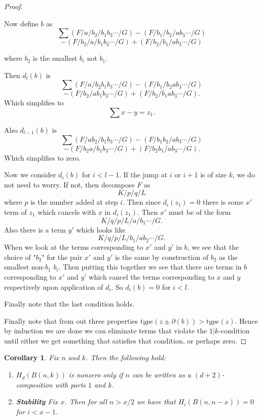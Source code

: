 \documentclass{amsart}
\newtheorem{corollary}[theorem]{Corollary}
\begin{document}
\begin{proof}
\begin{enumerate}
        Now define $b$ as
        $$ \sum (F/a/b_2/b_1b_3 \cdots/G) - (F/b_1/b_2/ab_3 \cdots/G)$$  
        $$- (F/b_2/a/b_1b_3 \cdots/G) + (F/b_2/b_1/ab_3 \cdots /G)$$
       
        where $b_2$ is the smallest $b_i$ not $b_1$.

        Then $d_l(b)$ is $$\sum (F/a/b_2b_1b_3 \cdots/G) - (F/b_1/b_2ab_3 \cdots/G)$$  $$- (F/b_2/ab_1b_3 \cdots/G) + 
        (F/b_2/b_1ab_3 \cdots /G).$$ Which simplifies to $$ \sum x-y = z_1.$$

        Also $d_{l-1}(b)$ is $$\sum (F/ab_2/b_1b_3 \cdots/G) - (F/b_1b_2/ab_3 \cdots/G)$$ $$- (F/b_2a/b_1b_3 \cdots/G) + 
        (F/b_2b_1/ab_3 \cdots /G).$$ Which simplifies to zero.


        Now we consider $d_i(b)$ for $i < l-1$. If the jump at $i$ or $i+1$ is of size $k$, we do not need to worry. 
        If not, then decompose $F$ as $$K/p/q/L$$ where $p$ is the number added at step $i$. Then since $d_i(z_1)=0$ there is some $x'$ term
        of $z_1$ which cancels with $x$ in $d_i(z_1)$. Then $x'$ must be of the form $$ K/q/p/L/a/b_1 \cdots/G.$$ Also there is a term $y'$
        which looks like $$K/q/p/L/b_1/ab_2 \cdots/G.$$ When we look at the terms corresponding to $x'$ and $y'$ in $b$, we see that the 
        choice of "$b_2$" for the pair $x'$ and $y'$ is the same by construction of $b_2$ as the smallest non-$b_1$ $b_i$. Then putting this
        together we see that there are terms in $b$ corresponding to $x'$ and $y'$ which cancel the terms corresponding to $x$ and $y$ 
        respectively upon application of $d_i$. So $d_i(b) = 0$ for $i < l$.

        Finally note that the last condition holds.
    \end{enumerate}

    Finally note that from out three properties  $type(z \pm \partial(b)) > type(z)$. Hence by induction we are done we can eliminate terms
    that violate the $1|k$-condition until either we get something that satisfies that condition, or perhaps zero.

  \end{proof}

  \begin{corollary} Fix $n$ and $k$. Then the following hold:

   \begin{enumerate}
    \item $H_d(B(n, k))$ is nonzero only if $n$ can be written as a $(d+2)$-composition with parts $1$ and $k$.
    \item {\bf Stability} Fix $x$. Then for all $n > x/2$ we have that $H_i(B(n, n-x)) = 0$ for $i < x - 1$. 
   \end{enumerate}
  \end{corollary}
\end{document}
